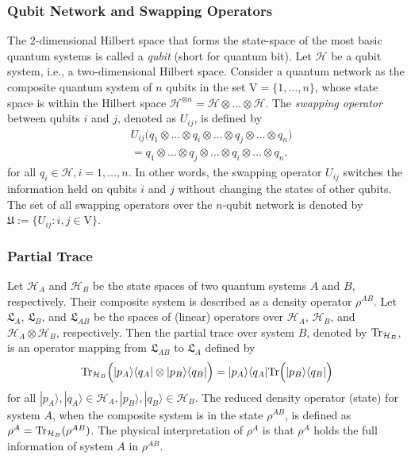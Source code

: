 \documentclass[a4paper, 11pt]{article}
\begin{document}
{\subsubsection{Qubit Network and Swapping Operators}
The $2$-dimensional Hilbert space that forms the state-space of the most basic quantum systems is called a {\it qubit} (short for quantum bit). Let $\mathcal{H}$ be a qubit system, i.e., a two-dimensional Hilbert space. Consider a quantum network as the composite quantum system of $n$ qubits in the set $\mathrm{V}=\{1,\dots,n\}$, whose state space is within the Hilbert space $\mathcal{H}^{\otimes n}=\mathcal{H}\otimes \dots \otimes \mathcal{H}$.  The {\it swapping operator} between qubits $i$ and $j$, denoted as $U_{ij}$,  is defined by
\begin{align*}
& {U_{ij}} \big(q_{1}\otimes \dots \otimes q_{i}\otimes \dots \otimes q_j\otimes \dots \otimes q_n\big)\nonumber\\
&= q_{1}\otimes \dots \otimes q_{j}\otimes \dots \otimes q_i\otimes \dots \otimes q_n,
\end{align*}
for all $q_i\in \mathcal{H}, i=1,\dots,n$. In other words, the swapping operator $U_{ij}$ switches the information held on qubits $i$ and $j$ without changing the states of other qubits. The set of all swapping operators over the $n$-{qubit} network is denoted {by} $\mathfrak{U}:=\big\{U_{ij}:i,j\in\mathrm{V}\big\}$.


\subsubsection{Partial Trace}
Let $\mathcal{H}_A$ and $\mathcal{H}_B$ be the state spaces of  two quantum systems $A$ and $B$, respectively. Their composite system is described as a density operator $\rho^{AB}$. Let $\mathfrak{L}_A$, $\mathfrak{L}_B$, and  $\mathfrak{L}_{AB}$ be the spaces of (linear) operators over  $\mathcal{H}_A$, $\mathcal{H}_B$, and  $\mathcal{H}_A\otimes\mathcal{H}_B$, respectively.   Then the partial trace over system $B$, denoted by ${\rm Tr}_{\mathcal{H}_B}$, is an operator mapping from $\mathfrak{L}_{AB}$ to $\mathfrak{L}_{A}$ defined by
$$
{\rm Tr}_{\mathcal{H}_B}\Big(|p_A\rangle  \langle q_A| \otimes  |p_B\rangle  \langle q_B| \Big)= |p_A\rangle  \langle q_A|  {\rm Tr} \Big(  |p_B\rangle  \langle q_B| \Big)
$$
for  all $|p_A\rangle, |q_A \rangle\in \mathcal{H}_A, |p_B\rangle, |q_B\rangle \in \mathcal{H}_B$.
The reduced density operator (state) for system $A$, when the composite system is in the state  $\rho^{AB}$, is defined as $\rho^A= {\rm Tr}_{\mathcal{H}_B}(\rho^{AB})$. The physical interpretation of $\rho^A$ is that $\rho^A$ holds the full information of system $A$ in $\rho^{AB}$.


}
\end{document}
